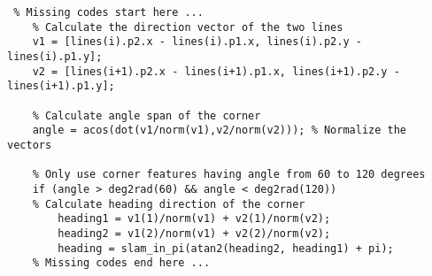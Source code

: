 \begin{lstlisting}
 % Missing codes start here ...
    % Calculate the direction vector of the two lines
    v1 = [lines(i).p2.x - lines(i).p1.x, lines(i).p2.y - lines(i).p1.y];
    v2 = [lines(i+1).p2.x - lines(i+1).p1.x, lines(i+1).p2.y - lines(i+1).p1.y];

    % Calculate angle span of the corner
    angle = acos(dot(v1/norm(v1),v2/norm(v2))); % Normalize the vectors
                
    % Only use corner features having angle from 60 to 120 degrees 
    if (angle > deg2rad(60) && angle < deg2rad(120))
	% Calculate heading direction of the corner
        heading1 = v1(1)/norm(v1) + v2(1)/norm(v2);
        heading2 = v1(2)/norm(v1) + v2(2)/norm(v2);
        heading = slam_in_pi(atan2(heading2, heading1) + pi);
    % Missing codes end here ...
\end{lstlisting}
\label{fig:SLAMLidarExTRN.}